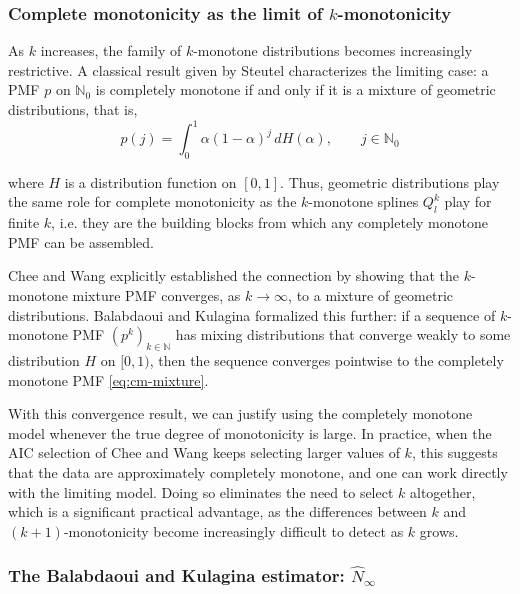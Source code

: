 ﻿\documentclass{article}
\begin{document}
\subsubsection{Complete monotonicity as the limit of \texorpdfstring{$k$}{k}-monotonicity}

As $k$ increases, the family of $k$-monotone distributions becomes increasingly restrictive. A classical result given by Steutel \cite{Steutel1969} characterizes the limiting case: a PMF $p$ on $\mathbb{N}_0$ is completely monotone if and only if it is a mixture of geometric distributions, that is,
\begin{equation}
p(j) = \int_0^1 \alpha(1-\alpha)^j \, dH(\alpha),
\qquad j \in \mathbb{N}_0
\label{eq:cm-mixture}
\end{equation}

where $H$ is a distribution function on $[0,1]$. Thus, geometric distributions play the same role for complete monotonicity as the $k$-monotone splines $Q^k_l$ play for finite $k$, i.e. they are the building blocks from which any completely monotone PMF can be assembled.

Chee and Wang \cite{CheeWang2016} explicitly established the connection by showing that the $k$-monotone mixture PMF converges, as $k \to \infty$, to a mixture of geometric distributions. Balabdaoui and Kulagina \cite{BalabdaouiKulagina2020} formalized this further: if a sequence of $k$-monotone PMF $(p^k)_{k \in \mathbb{N}}$ has mixing distributions that converge weakly to some distribution $H$ on $[0,1)$, then the sequence converges pointwise to the completely monotone PMF \eqref{eq:cm-mixture}.

\vspace{1em}

With this convergence result, we can justify using the completely monotone model whenever the true degree of monotonicity is large. In practice, when the AIC selection of Chee and Wang keeps selecting larger values of $k$, this suggests that the data are approximately completely monotone, and one can work directly with the limiting model. Doing so eliminates the need to select $k$ altogether, which is a significant practical advantage, as the differences between $k$ and $(k+1)$-monotonicity become increasingly difficult to detect as $k$ grows.

\subsubsection{The Balabdaoui and Kulagina estimator: \texorpdfstring{$\hat{N}_{\infty}$}{N-infinity}}
\end{document}
